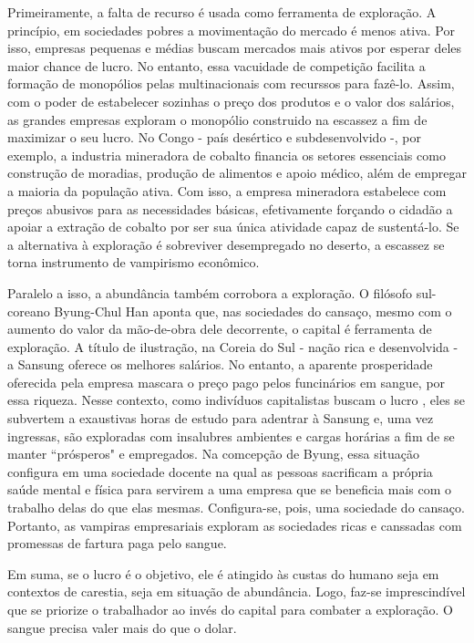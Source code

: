 \documentclass{article}
\begin{document}
Primeiramente, a falta de recurso é usada como ferramenta de exploração. A princípio, em sociedades pobres a movimentação do mercado é menos ativa. Por isso, empresas pequenas e médias buscam mercados mais ativos por esperar deles maior chance de lucro. No entanto, essa vacuidade de competição facilita a formação de monopólios pelas multinacionais com recurssos para fazê-lo. Assim, com o poder de estabelecer sozinhas o preço dos produtos e o valor dos salários, as grandes empresas exploram o monopólio construido na escassez a fim de maximizar o seu lucro. No Congo - país desértico e subdesenvolvido -, por exemplo, a industria mineradora de cobalto financia os setores essenciais como construção de moradias, produção de alimentos e apoio médico, além de empregar a maioria da população ativa. Com isso, a empresa mineradora estabelece com preços abusivos para as necessidades básicas, efetivamente forçando o cidadão a apoiar a extração de cobalto por ser sua única atividade capaz de sustentá-lo. Se a alternativa à exploração é sobreviver desempregado no deserto, a escassez se torna instrumento de vampirismo econômico.

Paralelo a isso, a abundância também corrobora a exploração. O filósofo sul-coreano Byung-Chul Han aponta que, nas sociedades do cansaço, mesmo com o aumento do valor da mão-de-obra dele decorrente, o capital é ferramenta de exploração. A título de ilustração, na Coreia do Sul - nação rica e desenvolvida - a Sansung oferece os melhores salários. No entanto, a aparente prosperidade oferecida pela empresa mascara o preço pago pelos funcinários em sangue, por essa riqueza. Nesse contexto, como indivíduos capitalistas buscam o lucro , eles se subvertem a exaustivas horas de estudo para adentrar à Sansung e, uma vez ingressas, são exploradas com insalubres ambientes e cargas horárias a fim de se manter “prósperos" e empregados. Na comcepção de Byung, essa situação configura em uma sociedade docente na qual as pessoas sacrificam a própria saúde mental e física para servirem a uma empresa que se beneficia mais com o trabalho delas do que elas mesmas. Configura-se, pois, uma sociedade do cansaço. Portanto, as vampiras empresariais exploram as sociedades ricas e canssadas com promessas de fartura paga pelo sangue.

Em suma, se o lucro é o objetivo, ele é atingido às custas do humano seja em contextos de carestia, seja em situação de abundância. Logo, faz-se imprescindível que se priorize o trabalhador ao invés do capital para combater a exploração. O sangue precisa valer mais do que o dolar.
\end{document}
